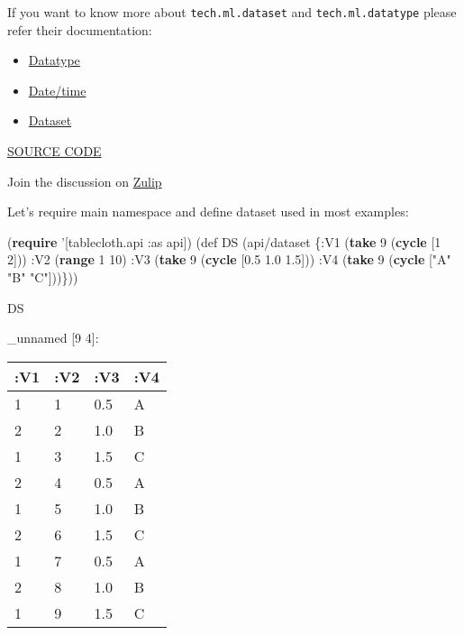 \documentclass[]{article}
\newenvironment{Shaded}{\begin{snugshade}}{\end{snugshade}}
\newcommand{\AttributeTok}[1]{\textcolor[rgb]{0.77,0.63,0.00}{#1}}
\newcommand{\BuiltInTok}[1]{#1}
\newcommand{\DecValTok}[1]{\textcolor[rgb]{0.00,0.00,0.81}{#1}}
\newcommand{\FloatTok}[1]{\textcolor[rgb]{0.00,0.00,0.81}{#1}}
\newcommand{\FunctionTok}[1]{\textcolor[rgb]{0.00,0.00,0.00}{#1}}
\newcommand{\KeywordTok}[1]{\textcolor[rgb]{0.13,0.29,0.53}{\textbf{#1}}}
\newcommand{\NormalTok}[1]{#1}
\newcommand{\StringTok}[1]{\textcolor[rgb]{0.31,0.60,0.02}{#1}}
\providecommand{\tightlist}{%
  \setlength{\itemsep}{0pt}\setlength{\parskip}{0pt}}
\begin{document}
If you want to know more about \texttt{tech.ml.dataset} and
\texttt{tech.ml.datatype} please refer their documentation:

\begin{itemize}
\tightlist
\item
  \href{https://github.com/techascent/tech.datatype/blob/master/docs/cheatsheet.md}{Datatype}
\item
  \href{https://github.com/techascent/tech.datatype/blob/master/docs/datetime.md}{Date/time}
\item
  \href{https://github.com/techascent/tech.ml.dataset/blob/master/docs/walkthrough.md}{Dataset}
\end{itemize}

\href{https://github.com/scicloj/tablecloth}{SOURCE CODE}

Join the discussion on
\href{https://clojurians.zulipchat.com/\#narrow/stream/236259-tech.2Eml.2Edataset.2Edev/topic/api}{Zulip}

Let's require main namespace and define dataset used in most examples:

\begin{Shaded}
\begin{Highlighting}[]
\NormalTok{(}\KeywordTok{require}\NormalTok{ '[tablecloth.api }\AttributeTok{:as}\NormalTok{ api])}
\NormalTok{(}\BuiltInTok{def}\FunctionTok{ DS }\NormalTok{(api/dataset \{}\AttributeTok{:V1}\NormalTok{ (}\KeywordTok{take} \DecValTok{9}\NormalTok{ (}\KeywordTok{cycle}\NormalTok{ [}\DecValTok{1} \DecValTok{2}\NormalTok{]))}
                      \AttributeTok{:V2}\NormalTok{ (}\KeywordTok{range} \DecValTok{1} \DecValTok{10}\NormalTok{)}
                      \AttributeTok{:V3}\NormalTok{ (}\KeywordTok{take} \DecValTok{9}\NormalTok{ (}\KeywordTok{cycle}\NormalTok{ [}\FloatTok{0.5} \FloatTok{1.0} \FloatTok{1.5}\NormalTok{]))}
                      \AttributeTok{:V4}\NormalTok{ (}\KeywordTok{take} \DecValTok{9}\NormalTok{ (}\KeywordTok{cycle}\NormalTok{ [}\StringTok{"A"} \StringTok{"B"} \StringTok{"C"}\NormalTok{]))\}))}
\end{Highlighting}
\end{Shaded}

\begin{Shaded}
\begin{Highlighting}[]
\NormalTok{DS}
\end{Highlighting}
\end{Shaded}

\_unnamed {[}9 4{]}:

\begin{longtable}[]{@{}llll@{}}
\toprule
:V1 & :V2 & :V3 & :V4\tabularnewline
\midrule
\endhead
1 & 1 & 0.5 & A\tabularnewline
2 & 2 & 1.0 & B\tabularnewline
1 & 3 & 1.5 & C\tabularnewline
2 & 4 & 0.5 & A\tabularnewline
1 & 5 & 1.0 & B\tabularnewline
2 & 6 & 1.5 & C\tabularnewline
1 & 7 & 0.5 & A\tabularnewline
2 & 8 & 1.0 & B\tabularnewline
1 & 9 & 1.5 & C\tabularnewline
\bottomrule
\end{longtable}
\end{document}

